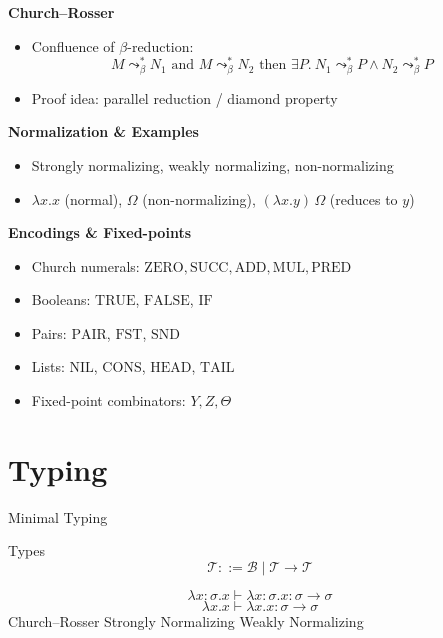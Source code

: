\documentclass[aspectratio=169]{beamer}
\newcommand{\checkedbox}{\fbox{\ding{51}}}
\newcommand{\Bset}{\mathcal{B}}
\newcommand{\Tset}{\mathcal{T}}
\newcommand{\curly}{\mathrel{\leadsto}_\beta}
\begin{document}
\begin{frame}
  \textbf{Church--Rosser}
  \begin{itemize}
  \item Confluence of $\beta$-reduction:
    \[
      M \curly^{*} N_1 \text{ and } M \curly^{*} N_2 \text{ then } \exists P.\ N_1 \curly^{*} P \land N_2 \curly^{*} P
    \]
  \item Proof idea: parallel reduction / diamond property
  \end{itemize}

  \textbf{Normalization \& Examples}
  \begin{itemize}
  \item Strongly normalizing, weakly normalizing, non-normalizing
  \item $\lambda x.x$ (normal), $\Omega$ (non-normalizing), $(\lambda x.y)\,\Omega$ (reduces to $y$)
  \end{itemize}
\end{frame}

\begin{frame}
  \textbf{Encodings \& Fixed-points}
  \begin{itemize}
  \item Church numerals: $\mathrm{ZERO}, \mathrm{SUCC}, \mathrm{ADD}, \mathrm{MUL}, \mathrm{PRED}$
  \item Booleans: $\mathrm{TRUE}$, $\mathrm{FALSE}$, $\mathrm{IF}$
  \item Pairs: $\mathrm{PAIR}$, $\mathrm{FST}$, $\mathrm{SND}$
  \item Lists: $\mathrm{NIL}$, $\mathrm{CONS}$, $\mathrm{HEAD}$, $\mathrm{TAIL}$
  \item Fixed-point combinators: $Y, Z, \Theta$
  \end{itemize}
\end{frame}

\section{Typing}

\begin{frame}{Minimal Typing}
  \begin{block}{Types}
    \[
      \Tset ::= \Bset \mid \Tset \to \Tset
    \]

  \end{block}
  \[
    \lambda x : \sigma . x
    \vdash \lambda x : \sigma . x : \sigma \to \sigma
  \]
  \[
    \lambda x . x
    \vdash \lambda x . x : \sigma \to \sigma
  \]
  \vfill
  \hfill Church--Rosser \checkedbox \hfill Strongly Normalizing \checkedbox \hfill Weakly Normalizing \checkedbox \hfill
\end{frame}
\end{document}

